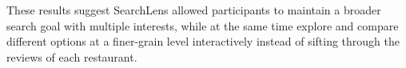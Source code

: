 

These results suggest SearchLens allowed participants to maintain a broader search goal with multiple interests, while at the same time explore and compare different options at a finer-grain level interactively instead of sifting through the reviews of each restaurant.













